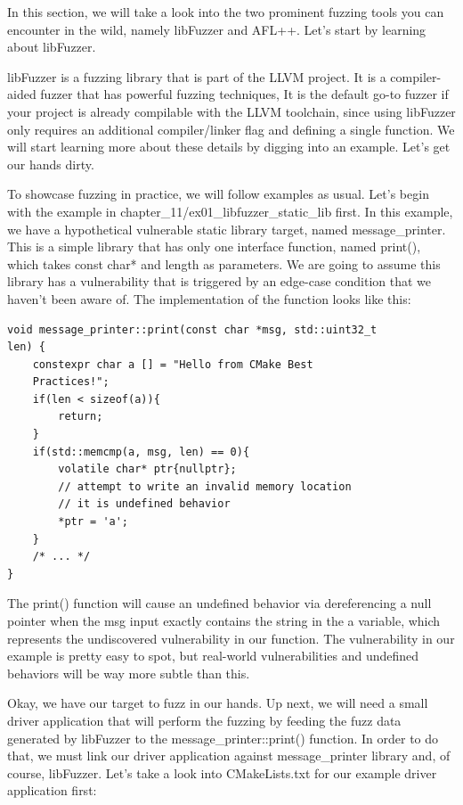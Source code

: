 
In this section, we will take a look into the two prominent fuzzing tools you can encounter in the wild, namely libFuzzer and AFL++. Let's start by learning about libFuzzer.


libFuzzer is a fuzzing library that is part of the LLVM project. It is a compiler-aided fuzzer that has powerful fuzzing techniques, It is the default go-to fuzzer if your project is already compilable with the LLVM toolchain, since using libFuzzer only requires an additional compiler/linker flag and defining a single function. We will start learning more about these details by digging into an example. Let's get our hands dirty.

To showcase fuzzing in practice, we will follow examples as usual. Let's begin with the example in chapter\_11/ex01\_libfuzzer\_static\_lib first. In this example, we have a hypothetical vulnerable static library target, named message\_printer. This is a simple library that has only one interface function, named print(), which takes const char* and length as parameters. We are going to assume this library has a vulnerability that is triggered by an edge-case condition that we haven't been aware of. The implementation of the function looks like this:

\begin{lstlisting}[style=styleCXX]
void message_printer::print(const char *msg, std::uint32_t
len) {
	constexpr char a [] = "Hello from CMake Best
	Practices!";
	if(len < sizeof(a)){
		return;
	}
	if(std::memcmp(a, msg, len) == 0){
		volatile char* ptr{nullptr};
		// attempt to write an invalid memory location
		// it is undefined behavior
		*ptr = 'a';
	}
	/* ... */
}
\end{lstlisting}

The print() function will cause an undefined behavior via dereferencing a null pointer when the msg input exactly contains the string in the a variable, which represents the undiscovered vulnerability in our function. The vulnerability in our example is pretty easy to spot, but real-world vulnerabilities and undefined behaviors will be way more subtle than this.

Okay, we have our target to fuzz in our hands. Up next, we will need a small driver application that will perform the fuzzing by feeding the fuzz data generated by libFuzzer to the message\_printer::print() function. In order to do that, we must link our driver application against message\_printer library and, of course, libFuzzer. Let's take a look into CMakeLists.txt for our example driver application first:


